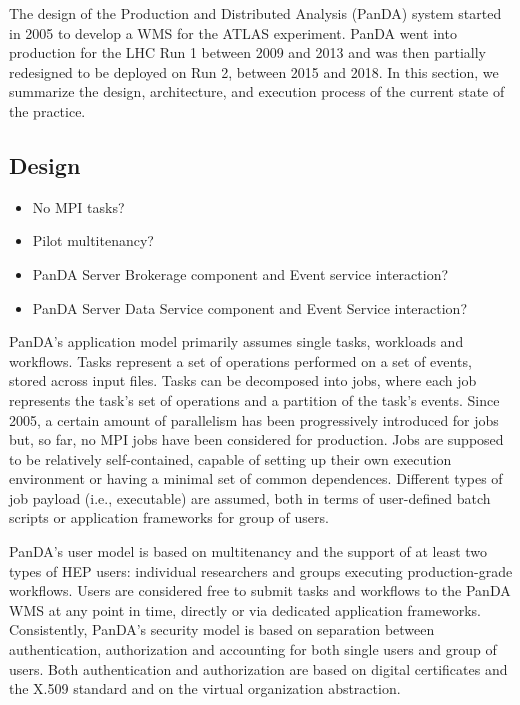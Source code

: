 
The design of the Production and Distributed Analysis (PanDA) system started in
2005 to develop a WMS for the ATLAS experiment. PanDA went into production for
the LHC Run 1 between 2009 and 2013 and was then partially redesigned to be
deployed on Run 2, between 2015 and 2018. In this section, we summarize the
design, architecture, and execution process of the current state of the
practice.


\subsection{Design}
\label{ssec:panda_design}

\begin{itemize}
  \item No MPI tasks?
  \item Pilot multitenancy?
  \item PanDA Server Brokerage component and Event service interaction?
  \item PanDA Server Data Service component and Event Service interaction?
\end{itemize}

PanDA's application model primarily assumes single tasks, workloads and
workflows. Tasks represent a set of operations performed on a set of events,
stored across input files. Tasks can be decomposed into jobs, where each job
represents the task's set of operations and a partition of the task's events.
Since 2005, a certain amount of parallelism has been progressively introduced
for jobs~\cite{multithreaded_jobs} but, so far, no MPI jobs have been considered
for production. Jobs are supposed to be relatively self-contained, capable of
setting up their own execution environment or having a minimal set of common
dependences. Different types of job payload (i.e., executable) are assumed, both
in terms of user-defined batch scripts or application frameworks for group of
users.

PanDA's user model is based on multitenancy and the support of at least two
types of HEP users: individual researchers and groups executing production-grade
workflows. Users are considered free to submit tasks and workflows to the PanDA
WMS at any point in time, directly or via dedicated application frameworks.
Consistently, PanDA's security model is based on separation between
authentication, authorization and accounting for both single users and group of
users. Both authentication and authorization are based on digital certificates
and the X.509 standard and on the virtual organization abstraction.

